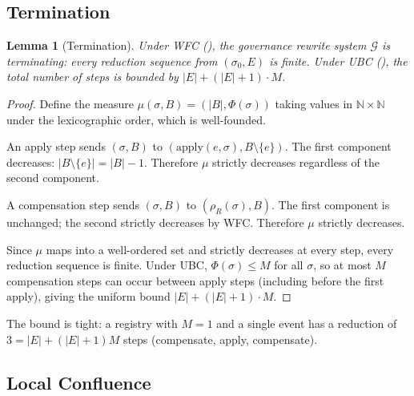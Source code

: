 \documentclass[11pt,a4paper]{article}
\theoremstyle{plain}
\newtheorem{lemma}[theorem]{Lemma}
\theoremstyle{definition}
\theoremstyle{remark}
\begin{document}
\subsection{Termination}

\begin{lemma}[Termination]
\label{lem:termination}
Under WFC (), the governance rewrite system $\mathcal{G}$ is
terminating: every reduction sequence from $(\sigma_0, E)$ is finite.
Under UBC (), the total number of steps is bounded by
$|E| + (|E| + 1) \cdot M$.
\end{lemma}
\begin{proof}
Define the measure $\mu(\sigma, B) = (|B|, \Phi(\sigma))$ taking values in
$\mathbb{N} \times \mathbb{N}$ under the lexicographic order, which is
well-founded.

An apply step sends $(\sigma, B)$ to $(\mathrm{apply}(e, \sigma), B \setminus \{e\})$.
The first component decreases: $|B \setminus \{e\}| = |B| - 1$.  Therefore
$\mu$ strictly decreases regardless of the second component.

A compensation step sends $(\sigma, B)$ to $(\rho_R(\sigma), B)$.  The first
component is unchanged; the second strictly decreases by WFC.
Therefore $\mu$ strictly decreases.

Since $\mu$ maps into a well-ordered set and strictly decreases at every step,
every reduction sequence is finite.  Under UBC, $\Phi(\sigma) \leq M$ for all
$\sigma$, so at most $M$ compensation steps can occur between apply steps
(including before the first apply), giving the uniform bound
$|E| + (|E| + 1) \cdot M$.
\end{proof}

The bound is tight: a registry with $M = 1$ and a single event has a
reduction of $3 = |E| + (|E|+1) M$ steps (compensate, apply, compensate).

\subsection{Local Confluence}
\end{document}
